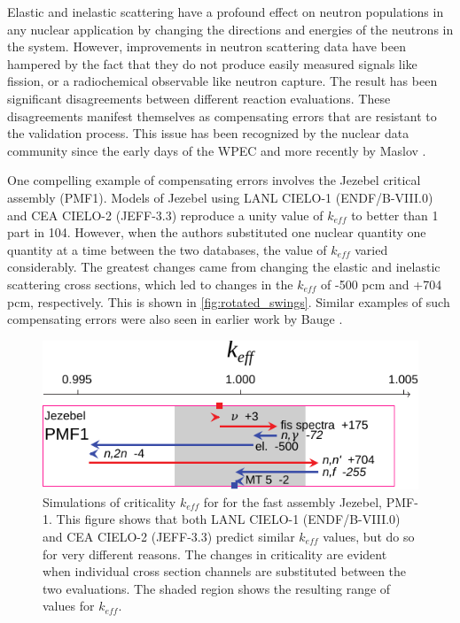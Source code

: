 \documentclass[letterpaper]{ar-1col}
\begin{document}
Elastic and inelastic scattering have a profound effect on neutron populations in any nuclear application by changing the directions and energies of the neutrons in the system.
 However, improvements in neutron scattering data have been hampered by the fact that they do not produce easily measured signals like fission, or a radiochemical observable like neutron capture.
 The result has been significant disagreements between different reaction evaluations.
 These disagreements manifest themselves as compensating errors that are resistant to the validation process.
 This issue has been recognized by the nuclear data community since the early days of the WPEC \cite{Row89} and more recently by Maslov \cite{Mas11}.
 

One compelling example of compensating errors involves the Jezebel  critical assembly (PMF1).
 Models of Jezebel using LANL CIELO-1 (ENDF/B-VIII.0) and CEA CIELO-2 (JEFF-3.3) reproduce a unity value of $k_{eff}$ to better than 1 part in 104.
 However, when the authors substituted one nuclear quantity one quantity at a time between the two databases, the value of $k_{eff}$ varied considerably.
 The greatest changes came from changing the elastic and inelastic scattering cross sections, which led to changes in the $k_{eff}$ of -500 pcm and +704 pcm, respectively.
This is shown in \autoref{fig:rotated_swings}.
  Similar examples of such compensating errors were also seen in earlier work by Bauge \cite{Bau12}.
 

\begin{figure}
 \centering
 \includegraphics[width=0.8\linewidth]{rotated_swings.pdf}

 \caption{Simulations of criticality $k_{eff}$ for  for the fast assembly Jezebel, PMF-1.
This figure shows that both LANL CIELO-1 (ENDF/B-VIII.0) and CEA CIELO-2 (JEFF-3.3) predict similar $k_{eff}$ values, but do so for very different reasons.
The changes in criticality are evident when individual cross section channels are substituted between the two evaluations.
 The shaded region shows the  resulting range of values for $k_{eff}$.}
 \label{fig:rotated_swings}
\end{figure}
\end{document}
